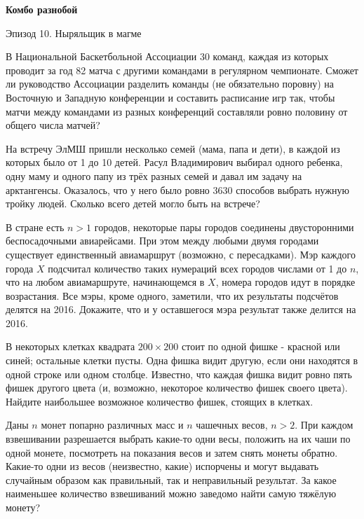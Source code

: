 \centerline{\bf \Huge Комбо разнобой}

\begin{flushright}
        \scriptsize{Эпизод 10. Ныряльщик в магме}
\end{flushright}

В Национальной Баскетбольной Ассоциации 30 команд, каждая из которых проводит за год 82 матча с другими командами в регулярном чемпионате. Сможет ли руководство Ассоциации разделить команды (не обязательно поровну) на Восточную и Западную конференции и составить расписание игр так, чтобы матчи между командами из разных конференций составляли ровно половину от общего числа матчей?

На встречу ЭлМШ пришли несколько семей (мама, папа и дети), в каждой из которых было от 1 до 10 детей. Расул Владимирович выбирал одного ребенка, одну маму и одного папу из трёх разных семей и давал им задачу на арктангенсы. Оказалось, что у него было ровно 3630 способов выбрать нужную тройку людей. Сколько всего детей могло быть на встрече?

В стране есть $n>1$ городов, некоторые пары городов соединены двусторонними беспосадочными авиарейсами. При этом между любыми двумя городами существует единственный авиамаршрут (возможно, с пересадками). Мэр каждого города $X$ подсчитал количество таких нумераций всех городов числами от 1 до $n$, что на любом авиамаршруте, начинающемся в $X$, номера городов идут в порядке возрастания. Все мэры, кроме одного, заметили, что их результаты подсчётов делятся на 2016. Докажите, что и у оставшегося мэра результат также делится на 2016.

В некоторых клетках квадрата $200 \times 200$ стоит по одной фишке - красной или синей; остальные клетки пусты. Одна фишка видит другую, если они находятся в одной строке или одном столбце. Известно, что каждая фишка видит ровно пять фишек другого цвета (и, возможно, некоторое количество фишек своего цвета). Найдите наибольшее возможное количество фишек, стоящих в клетках.

Даны $n$ монет попарно различных масс и $n$ чашечных весов, $n>2$. При каждом взвешивании разрешается выбрать какие-то одни весы, положить на их чаши по одной монете, посмотреть на показания весов и затем снять монеты обратно. Какие-то одни из весов (неизвестно, какие) испорчены и могут выдавать случайным образом как правильный, так и неправильный результат. За какое наименьшее количество взвешиваний можно заведомо найти самую тяжёлую монету?


